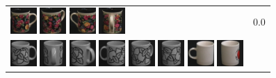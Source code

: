\begin{figure}[bp]
\begin{tabular}{m{11cm} | m{3cm} |}
\includegraphics[width=1cm]{coil/beeld-60.eps}
\includegraphics[width=1cm]{coil/beeld-63.eps}
\includegraphics[width=1cm]{coil/beeld-61.eps}
\includegraphics[width=1cm]{coil/beeld-65.eps}
& {\scriptsize 0.0}
\\
\includegraphics[width=1cm]{coil/beeld-48.eps}
\includegraphics[width=1cm]{coil/beeld-50.eps}
\includegraphics[width=1cm]{coil/beeld-49.eps}
\includegraphics[width=1cm]{coil/beeld-51.eps}
\includegraphics[width=1cm]{coil/beeld-53.eps}
\includegraphics[width=1cm]{coil/beeld-52.eps}
\includegraphics[width=1cm]{coil/beeld-37.eps}
\includegraphics[width=1cm]{coil/beeld-38.eps}

\end{tabular}
\end{figure}
